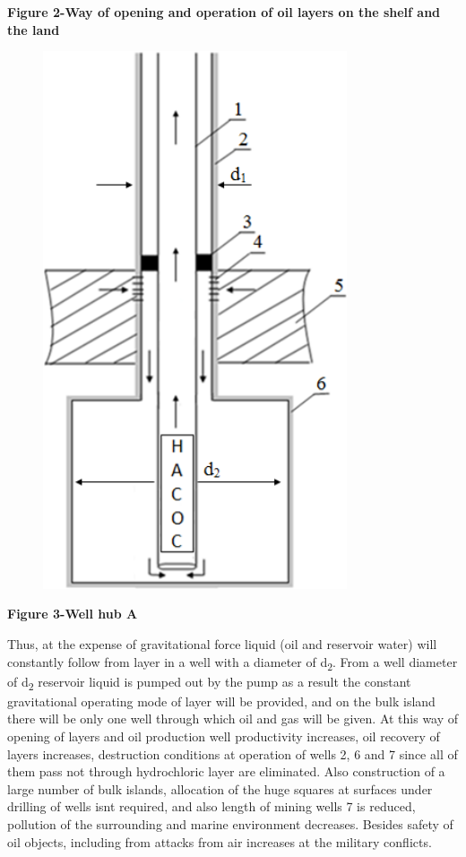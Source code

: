 {\bfseries Figure 2-Way of opening and operation of oil layers on the shelf
and the land}

\begin{figure}[H]
	\centering
	\includegraphics[width=0.8\textwidth]{assets/1341}
	\caption*{}
\end{figure}

{\bfseries Figure 3-Well hub A}

Thus, at the expense of gravitational force liquid (oil and reservoir
water) will constantly follow from layer in a well with a diameter of
d\textsubscript{2}. From a well diameter of d\textsubscript{2} reservoir
liquid is pumped out by the pump as a result the constant gravitational
operating mode of layer will be provided, and on the bulk island there
will be only one well through which oil and gas will be given. At this
way of opening of layers and oil production well productivity increases,
oil recovery of layers increases, destruction conditions at operation of
wells 2, 6 and 7 since all of them pass not through hydrochloric layer
are eliminated. Also construction of a large number of bulk islands,
allocation of the huge squares at surfaces under drilling of wells
isn\textquotesingle t required, and also length of mining wells 7 is
reduced, pollution of the surrounding and marine environment decreases.
Besides safety of oil objects, including from attacks from air increases
at the military conflicts.

